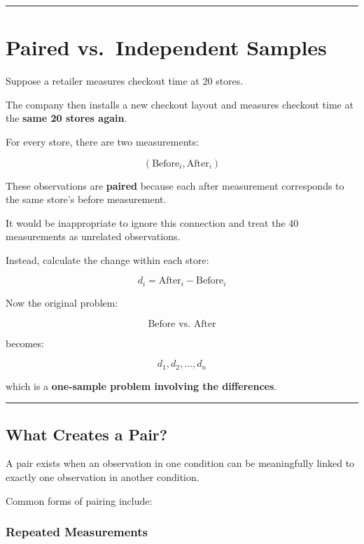 \documentclass[
  letterpaper,
  DIV=11,
  numbers=noendperiod]{scrreprt}
\begin{document}
\begin{center}\rule{0.5\linewidth}{0.5pt}\end{center}


\chapter{Paired vs.~Independent
Samples}\label{paired-vs.-independent-samples}

Suppose a retailer measures checkout time at 20 stores.

The company then installs a new checkout layout and measures checkout
time at the \textbf{same 20 stores again}.

For every store, there are two measurements:

\[
(\text{Before}_i,\text{After}_i)
\]

These observations are \textbf{paired} because each after measurement
corresponds to the same store's before measurement.

It would be inappropriate to ignore this connection and treat the 40
measurements as unrelated observations.

Instead, calculate the change within each store:

\[
d_i=\text{After}_i-\text{Before}_i
\]

Now the original problem:

\[
\text{Before vs. After}
\]

becomes:

\[
d_1,d_2,\ldots,d_n
\]

which is a \textbf{one-sample problem involving the differences}.

\begin{center}\rule{0.5\linewidth}{0.5pt}\end{center}

\section{What Creates a Pair?}\label{what-creates-a-pair}

A pair exists when an observation in one condition can be meaningfully
linked to exactly one observation in another condition.

Common forms of pairing include:

\subsection{Repeated Measurements}\label{repeated-measurements}
\end{document}
